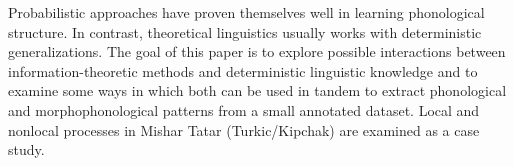 Probabilistic approaches have proven themselves well in learning phonological structure. In contrast, theoretical linguistics usually works with deterministic generalizations. The goal of this paper is to explore possible interactions between information-theoretic methods and deterministic linguistic knowledge and to examine some ways in which both can be used in tandem to extract phonological and morphophonological patterns from a small annotated dataset. Local and nonlocal processes in Mishar Tatar (Turkic/Kipchak) are examined as a case study.

